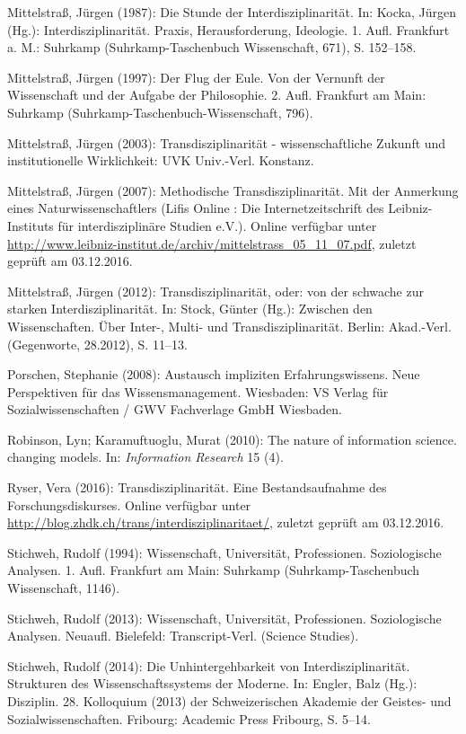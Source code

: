 \documentclass[a4paper,
fontsize=11pt,
oneside,
numbers=noperiodatend,
parskip=half-,
bibliography=totoc,
final
]{scrartcl}
\begin{document}
Mittelstraß, Jürgen (1987): Die Stunde der Interdisziplinarität. In:
Kocka, Jürgen (Hg.): Interdisziplinarität. Praxis, Herausforderung,
Ideologie. 1. Aufl. Frankfurt a. M.: Suhrkamp (Suhrkamp-Taschenbuch
Wissenschaft, 671), S. 152--158.

Mittelstraß, Jürgen (1997): Der Flug der Eule. Von der Vernunft der
Wissenschaft und der Aufgabe der Philosophie. 2. Aufl. Frankfurt am
Main: Suhrkamp (Suhrkamp-Taschenbuch-Wissenschaft, 796).

Mittelstraß, Jürgen (2003): Transdisziplinarität - wissenschaftliche
Zukunft und institutionelle Wirklichkeit: UVK Univ.-Verl. Konstanz.

Mittelstraß, Jürgen (2007): Methodische Transdisziplinarität. Mit der
Anmerkung eines Naturwissenschaftlers (Lifis Online : Die
Internetzeitschrift des Leibniz-Instituts für interdisziplinäre Studien
e.V.). Online verfügbar unter
\url{http://www.leibniz-institut.de/archiv/mittelstrass_05_11_07.pdf},
zuletzt geprüft am 03.12.2016.

Mittelstraß, Jürgen (2012): Transdisziplinarität, oder: von der schwache
zur starken Interdisziplinarität. In: Stock, Günter (Hg.): Zwischen den
Wissenschaften. Über Inter-, Multi- und Transdisziplinarität. Berlin:
Akad.-Verl. (Gegenworte, 28.2012), S. 11--13.

Porschen, Stephanie (2008): Austausch impliziten Erfahrungswissens. Neue
Perspektiven für das Wissensmanagement. Wiesbaden: VS Verlag für
Sozialwissenschaften / GWV Fachverlage GmbH Wiesbaden.

Robinson, Lyn; Karamuftuoglu, Murat (2010): The nature of information
science. changing models. In: \emph{Information Research} 15 (4).

Ryser, Vera (2016): Transdisziplinarität. Eine Bestandsaufnahme des
Forschungsdiskurses. Online verfügbar unter
\url{http://blog.zhdk.ch/trans/interdisziplinaritaet/}, zuletzt geprüft
am 03.12.2016.

Stichweh, Rudolf (1994): Wissenschaft, Universität, Professionen.
Soziologische Analysen. 1. Aufl. Frankfurt am Main: Suhrkamp
(Suhrkamp-Taschenbuch Wissenschaft, 1146).

Stichweh, Rudolf (2013): Wissenschaft, Universität, Professionen.
Soziologische Analysen. Neuaufl. Bielefeld: Transcript-Verl. (Science
Studies).

Stichweh, Rudolf (2014): Die Unhintergehbarkeit von
Interdisziplinarität. Strukturen des Wissenschaftssystems der Moderne.
In: Engler, Balz (Hg.): Disziplin. 28. Kolloquium (2013) der
Schweizerischen Akademie der Geistes- und Sozialwissenschaften.
Fribourg: Academic Press Fribourg, S. 5--14.
\end{document}
